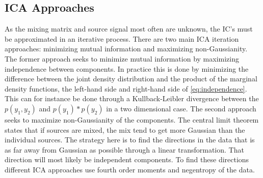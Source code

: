 \subsection{ICA Approaches}
As the mixing matrix and source signal most often are unknown, the IC’s must be approximated in an iterative process. There are two main ICA iteration approaches: minimizing mutual information and maximizing non-Gaussianity. The former approach seeks to minimize mutual information by maximizing independence between components. In practice this is done by minimizing the difference between the joint density distribution and the product of the marginal density functions, the left-hand side and right-hand side of \eqref{eq:independence}. This can for instance be done through a Kullback-Leibler divergence between the $p(y_1,y_2)$ and $p(y_1)*p(y_2)$ in a two dimensional case.
The second approach seeks to maximize non-Gaussianity of the components. The central limit theorem states that if sources are mixed, the mix tend to get more Gaussian than the individual sources. The strategy here is to find the directions in the data that is as far away from Gaussian as possible through a linear transformation. That direction will most likely be independent components. To find these directions different ICA approaches use fourth order moments and negentropy of the data. \cite{Hyvarinen2001} 
%
%
%
